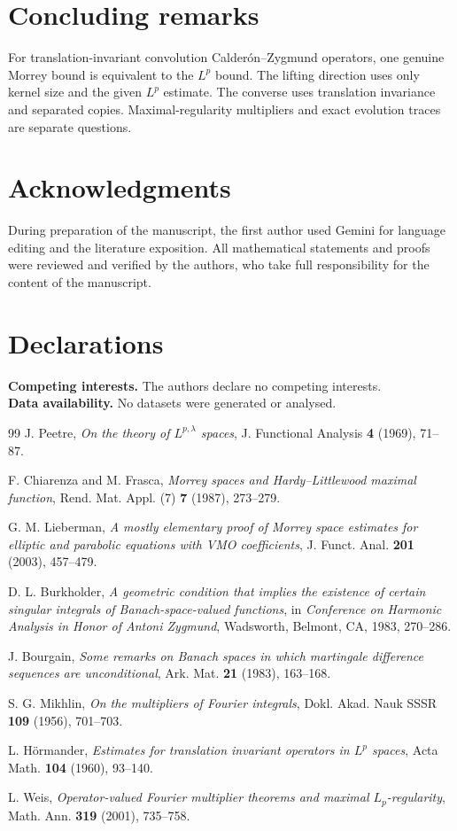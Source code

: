 \documentclass[11pt]{article}
\theoremstyle{definition}
\begin{document}
	
\section{Concluding remarks}
For translation-invariant convolution Calder\'on--Zygmund operators, one genuine Morrey bound is equivalent to the $L^p$ bound. The lifting direction uses only kernel size and the given $L^p$ estimate. The converse uses translation invariance and separated copies. Maximal-regularity multipliers and exact evolution traces are separate questions.

\section*{Acknowledgments}
During preparation of the manuscript, the first author used Gemini for language editing and the literature exposition. All mathematical statements and proofs were reviewed and verified by the authors, who take full responsibility for the content of the manuscript.

\section*{Declarations}
\noindent\textbf{Competing interests.} The authors declare no competing interests.\\
\noindent\textbf{Data availability.} No datasets were generated or analysed.

\begin{thebibliography}{99}
J. Peetre,
\emph{On the theory of $L^{p,\lambda}$ spaces},
J. Functional Analysis \textbf{4} (1969), 71--87.

F. Chiarenza and M. Frasca,
\emph{Morrey spaces and Hardy--Littlewood maximal function},
Rend. Mat. Appl. (7) \textbf{7} (1987), 273--279.

G. M. Lieberman,
\emph{A mostly elementary proof of Morrey space estimates for elliptic and parabolic equations with VMO coefficients},
J. Funct. Anal. \textbf{201} (2003), 457--479.

D. L. Burkholder,
\emph{A geometric condition that implies the existence of certain singular integrals of Banach-space-valued functions},
in \emph{Conference on Harmonic Analysis in Honor of Antoni Zygmund},
Wadsworth, Belmont, CA, 1983, 270--286.

J. Bourgain,
\emph{Some remarks on Banach spaces in which martingale difference sequences are unconditional},
Ark. Mat. \textbf{21} (1983), 163--168.

S. G. Mikhlin,
\emph{On the multipliers of Fourier integrals},
Dokl. Akad. Nauk SSSR \textbf{109} (1956), 701--703.

L. H\"ormander,
\emph{Estimates for translation invariant operators in $L^p$ spaces},
Acta Math. \textbf{104} (1960), 93--140.

L. Weis,
\emph{Operator-valued Fourier multiplier theorems and maximal $L_p$-regularity},
Math. Ann. \textbf{319} (2001), 735--758.
\end{thebibliography}
\end{document}
